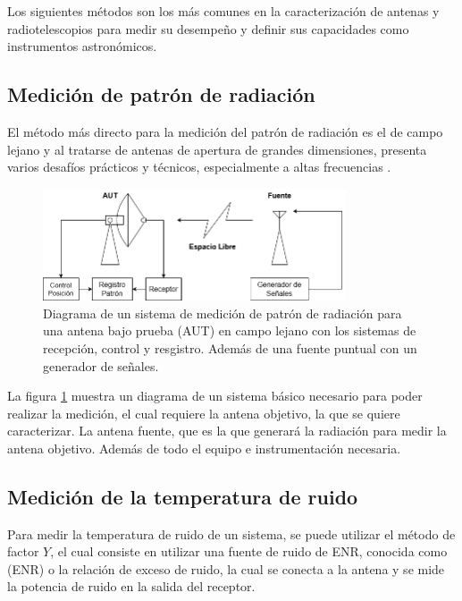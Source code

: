 Los siguientes métodos son los más comunes en la caracterización de antenas y radiotelescopios para medir su desempeño y definir sus capacidades como instrumentos astronómicos.\\

\subsection{Medición de patrón de radiación}

El método más directo para la medición del patrón de radiación es el de campo lejano y al tratarse de antenas de apertura de grandes dimensiones, presenta varios desafíos prácticos y técnicos, especialmente a altas frecuencias \cite{Astudillo2014}.\\

\begin{figure}
    \centering
    \includegraphics[width = 0.8\textwidth]{img/farfielddiag}
    \caption{Diagrama de un sistema de medición de patrón de radiación para una antena bajo prueba (AUT) en campo lejano con los sistemas de recepción, control y resgistro. Además de una fuente puntual con un generador de señales.}
    \label{fig:farfield}
\end{figure}

La figura \ref{fig:farfield} muestra un diagrama de un sistema básico necesario para poder realizar la medición, el cual requiere la antena objetivo, la que se quiere caracterizar. La antena fuente, que es la que generará la radiación para medir la antena objetivo. Además de todo el equipo e instrumentación necesaria.\\

\subsection{Medición de la temperatura de ruido}

Para medir la temperatura de ruido de un sistema, se puede utilizar el método de factor $Y$, el cual consiste en utilizar una fuente de ruido de ENR, conocida como (ENR) o la relación de exceso de ruido, la cual se conecta a la antena y se mide la potencia de ruido en la salida del receptor.\\

